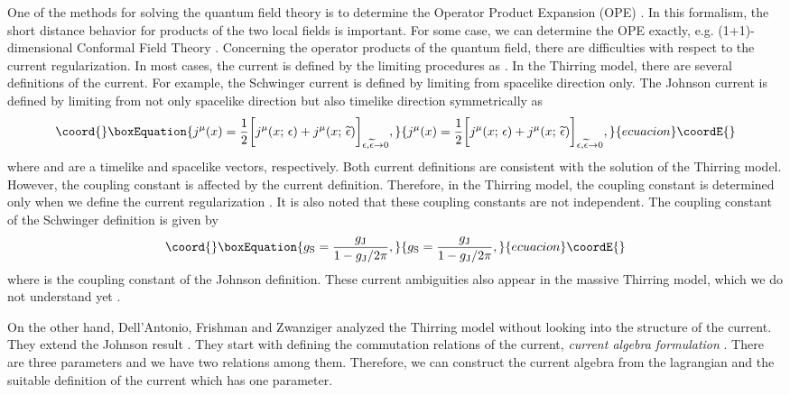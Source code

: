 \documentclass[a4paper,fleqn]{article}
\begin{document}
One of the methods for solving the quantum field theory is to determine the Operator Product 
Expansion (OPE) \cite{wilson69,kad69}. In this formalism, the short distance behavior 
for products of the two local fields is important. For some case, we can determine the 
OPE exactly, e.g. (1+1)-dimensional Conformal Field Theory \cite{bel_pol_zam84}.
Concerning the operator products of the quantum field,
there are difficulties with respect to the current regularization. 
In most cases, the current is defined by the limiting procedures as 
\coordHE{}. In the Thirring model, there are 
several definitions of the current. 
For example, the Schwinger current \cite{sch59} is defined by limiting from
spacelike direction only. The Johnson current \cite{joh61}
is defined by limiting from not only spacelike direction but
 also timelike direction symmetrically as
\begin{equation}\coord{}\boxEquation{
j^\mu (x) = \frac{1}{2} \biggl[j^\mu(x;\, \epsilon)
          + j^\mu(x;\, \widetilde\epsilon) 
         \biggr]_{\epsilon, \widetilde\epsilon \rightarrow 0},
}{
j^\mu (x) = \frac{1}{2} \biggl[j^\mu(x;\, \epsilon)
          + j^\mu(x;\, \widetilde\epsilon) 
         \biggr]_{\epsilon, \widetilde\epsilon \rightarrow 0},
}{ecuacion}\coordE{}\end{equation}
where \myHighlight{$\epsilon$}\coordHE{} and \myHighlight{$\widetilde\epsilon$}\coordHE{} are a timelike and spacelike
vectors, respectively.
Both current definitions are consistent with the solution of the Thirring model.
However, the coupling constant is affected by the current definition.
Therefore, in the Thirring model, the coupling constant is determined only when 
we define the current regularization \cite{kla67}. It is also noted that
these coupling constants are not independent. The coupling constant of 
the Schwinger definition \coordHE{} is given by
\begin{equation}\coord{}\boxEquation{
g_{\rm S} = \frac{g_{\rm J}}{1 - g_{\rm J}/2 \pi},
}{
g_{\rm S} = \frac{g_{\rm J}}{1 - g_{\rm J}/2 \pi},
}{ecuacion}\coordE{}\end{equation}
where \coordHE{} is the coupling constant of the Johnson definition.
These current ambiguities also appear in the massive Thirring model, which
we do not understand yet \cite{fkt2000}.

On the other hand, Dell'Antonio, Frishman and Zwanziger \cite{del_fri_zwa} 
analyzed the Thirring model without looking into the structure of the current.
They extend the Johnson result \cite{joh61}.
They start with defining the commutation relations of the current, 
{\it current algebra formulation} \cite{wilson69,kad69}.
There are three parameters and we have two relations among them.
Therefore, we can construct the current algebra from the lagrangian and 
the suitable definition of the current which has one parameter.
\end{document}
